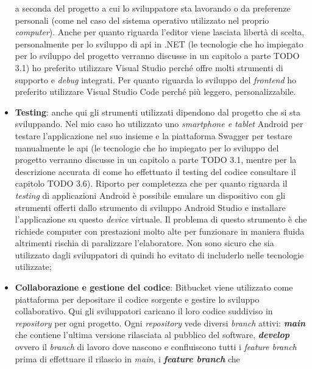 \begin{itemize}
            a seconda del progetto a cui lo sviluppatore sta lavorando o da preferenze personali (come nel caso del 
            sistema operativo utilizzato nel proprio \textit{computer}). Anche per quanto riguarda l'editor viene lasciata 
            libertà di scelta, personalmente per lo sviluppo di \gls{api} in .NET (le tecnologie che ho impiegato per lo sviluppo del 
            progetto verranno discusse in un capitolo a parte TODO 3.1) ho preferito utilizzare Visual Studio perché offre 
            molti strumenti di supporto e \textit{debug} integrati. Per quanto riguarda lo sviluppo del \textit{frontend} ho 
            preferito utilizzare Visual Studio Code perché più leggero, personalizzabile.
      \item \textbf{Testing}: anche qui gli strumenti utilizzati dipendono dal progetto che si sta sviluppando. Nel mio 
            caso ho utilizzato uno \textit{smartphone e tablet} Android per testare l'applicazione nel suo insieme e la 
            piattaforma Swagger per testare manualmente le \gls{api} (le tecnologie che ho impiegato per lo sviluppo del 
            progetto verranno discusse in un capitolo a parte TODO 3.1, mentre per la descrizione accurata di come ho 
            effettuato il testing del codice consultare il capitolo TODO 3.6). Riporto per completezza che per 
            quanto riguarda il \textit{testing} di applicazioni Android è possibile emulare un dispositivo con gli 
            strumenti offerti dallo strumento di sviluppo Android Studio e installare l'applicazione su questo \textit{device} 
            virtuale. Il problema di questo strumento è che richiede computer con prestazioni molto alte per funzionare 
            in maniera fluida altrimenti rischia di paralizzare l'elaboratore. Non sono sicuro che sia utilizzato dagli 
            sviluppatori di {\company} quindi ho evitato di includerlo nelle tecnologie utilizzate;
      \item \textbf{Collaborazione e gestione del codice}: Bitbucket viene utilizzato come piattaforma per depositare il codice 
            sorgente e gestire lo sviluppo collaborativo. Qui gli sviluppatori caricano il loro 
            codice suddiviso in \textit{repository} per ogni progetto. Ogni \textit{repository} vede diversi 
            \textit{branch} attivi: \textbf{\textit{main}} che contiene l'ultima versione rilasciata al pubblico del software, 
            \textbf{\textit{develop}} ovvero il \textit{branch} di lavoro dove nascono e confluiscono tutti i 
            \textit{feature branch} prima di effettuare il rilascio in \textit{main}, i \textbf{\textit{feature branch}} che 

\end{itemize}
